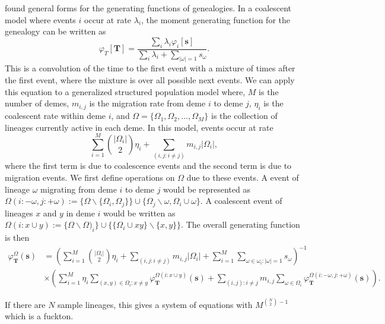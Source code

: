 \citet{Lohse2011} found general forms for the generating functions of genealogies.  In a coalescent model where events
$i$ occur at rate $ \lambda_i $, the moment generating function for the genealogy can be written as
\begin{equation}
  \varphi_{T}\left[ \mathbf{T} \right] = \frac{
    \sum_i \lambda_i \varphi_i[\mathbf{s}]}{
    \sum_i \lambda_i + \sum_{|\omega|=1}s_{\omega}}.
\end{equation}
This is a convolution of the time to the first event with a mixture of times after the first event, where the mixture is
over all possible next events. We can apply this equation to a generalized structured population model where, $M$ is the
number of demes, $m_{i,j}$ is the migration rate from deme $i$ to deme $j$, $\eta_i$ is the coalescent rate within deme
$i$, and $\Omega = \{ \Omega_1, \Omega_2, \ldots , \Omega_M \}$ is the collection of lineages currently active in each
deme. In this model, events occur at rate
\begin{equation}
  \sum_{i=1}^M \binom{|\Omega_i|}{2}\eta_i + \sum_{(i,j:i \neq j)} m_{i,j}|\Omega_i|,
\end{equation}
where the first term is due to coalescence events and the second term is due to migration events. We first define
operations on $\Omega$ due to these events. A event of lineage $\omega$ migrating from deme $i$ to deme $j$ would be
represented as $\Omega\left( i :-\omega, j: + \omega \right) := \{ \Omega\backslash \{\Omega_i, \Omega_j \} \} \cup
\{\Omega_j\backslash \omega, \Omega_i \cup \omega \}$. A coalescent event of lineages $x$ and $y$ in deme $i$ would be
written as $\Omega(i:x \cup y):=\{ \Omega \backslash \Omega)_i \}\cup\{ \{\Omega_i \cup xy \}\backslash \{ x,y \}\}$.
The overall generating function is then
\begin{align}
  \varphi_{\mathbf{T}}^{\Omega}(\mathbf{s}) &=
  \left( \sum_{i=1}^M \binom{|\Omega_i|}{2}\eta_i  + \sum_{(i,j:i \neq j)} m_{i,j}|\Omega_i| +
  \sum_{i=1}^M \sum_{\omega \in \omega_i : |\omega|=1}s_{\omega}\right)^{-1} \\
  &\times \left( \sum_{i=1}^M \eta_i \sum_{(x,y) \in \Omega_i:x \neq y}
  \varphi_{\mathbf{T}}^{\Omega(i:x \cup y)}(\mathbf{s}) + 
  \sum_{(i,j):i\neq j}m_{i,j}\sum_{\omega \in \Omega_i} \varphi_{\mathbf{T}}^{\Omega\left( i :-\omega, j: + \omega \right)}(\mathbf{s})\right).
\end{align}

If there are $N$ sample lineages, this gives a system of equations with $M^{\binom{N}{2}-1}$ which is a fuckton. 
